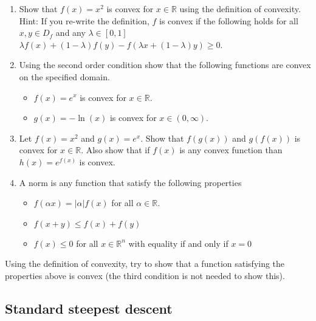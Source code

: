 \documentclass[%
oneside,                 %
final,                   %
10pt]{article}
\begin{document}
\begin{enumerate}
\item Show that $f(x)=x^2$ is convex for $x \in \mathbb{R}$ using the definition of convexity. Hint: If you re-write the definition, $f$ is convex if the following holds for all $x,y \in D_f$ and any $\lambda \in [0,1]$ $\lambda f(x)+(1-\lambda)f(y)-f(\lambda x + (1-\lambda) y ) \geq 0$.

\item Using the second order condition show that the following functions are convex on the specified domain.
\begin{itemize}

 \item $f(x) = e^x$ is convex for $x \in \mathbb{R}$.

 \item $g(x) = -\ln(x)$ is convex for $x \in (0,\infty)$.

\end{itemize}

\noindent
\item Let $f(x) = x^2$ and $g(x) = e^x$. Show that $f(g(x))$ and $g(f(x))$ is convex for $x \in \mathbb{R}$. Also show that if $f(x)$ is any convex function than $h(x) = e^{f(x)}$ is convex.

\item A norm is any function that satisfy the following properties
\begin{itemize}

 \item $f(\alpha x) = |\alpha| f(x)$ for all $\alpha \in \mathbb{R}$.

 \item $f(x+y) \leq f(x) + f(y)$

 \item $f(x) \leq 0$ for all $x \in \mathbb{R}^n$ with equality if and only if $x = 0$
\end{itemize}

\noindent
\end{enumerate}

\noindent
Using the definition of convexity, try to show that a function satisfying the properties above is convex (the third condition is not needed to show this).



\subsection{Standard steepest descent}
\end{document}
